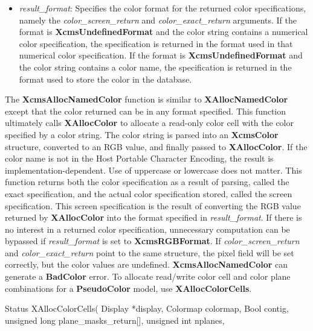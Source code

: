 \documentclass{report}
\begin{document}
\begin{itemize}
\begin{itemize}
                \item \textit{result\_format}: Specifies the color format for the returned color specifications, namely the \textit{color\_screen\_return} and \textit{color\_exact\_return} arguments. If the format is \textbf{XcmsUndefinedFormat} and the color string contains a numerical color specification, the specification is returned in the format used in that numerical color specification. If the format is \textbf{XcmsUndefinedFormat} and the color string contains a color name, the specification is returned in the format used to store the color in the database.
            \end{itemize}
            \bigbreak\noindent
            The \textbf{XcmsAllocNamedColor} function is similar to \textbf{XAllocNamedColor} except that the color returned can be in any format specified. This function ultimately calls \textbf{XAllocColor} to allocate a read-only color cell with the color specified by a color string. The color string is parsed into an \textbf{XcmsColor} structure, converted to an RGB value, and finally passed to \textbf{XAllocColor}. If the color name is not in the Host Portable Character Encoding, the result is implementation-dependent. Use of uppercase or lowercase does not matter.
            \bigbreak \noindent
            This function returns both the color specification as a result of parsing, called the exact specification, and the actual color specification stored, called the screen specification. This screen specification is the result of converting the RGB value returned by \textbf{XAllocColor} into the format specified in \textit{result\_format}. If there is no interest in a returned color specification, unnecessary computation can be bypassed if \textit{result\_format} is set to \textbf{XcmsRGBFormat}. If \textit{color\_screen\_return} and \textit{color\_exact\_return} point to the same structure, the pixel field will be set correctly, but the color values are undefined.
            \bigbreak \noindent
            \textbf{XcmsAllocNamedColor} can generate a \textbf{BadColor} error.
            \bigbreak \noindent
            To allocate read/write color cell and color plane combinations for a \textbf{PseudoColor} model, use \textbf{XAllocColorCells}.
            \bigbreak \noindent 
            \begin{cppcode}
                Status XAllocColorCells(
                    Display *display,
                    Colormap colormap,
                    Bool contig,
                    unsigned long plane_masks_return[],
                    unsigned int nplanes,

\end{cppcode}
\end{itemize}
\end{document}
